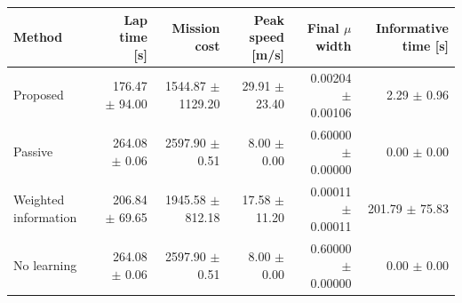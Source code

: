 \begin{tabular}{lrrrrr}
\toprule
Method & Lap time [s] & Mission cost & Peak speed [m/s] & Final $\mu$ width & Informative time [s] \\
\midrule
Proposed & 176.47 $\pm$ 94.00 & 1544.87 $\pm$ 1129.20 & 29.91 $\pm$ 23.40 & 0.00204 $\pm$ 0.00106 & 2.29 $\pm$ 0.96 \\
Passive & 264.08 $\pm$ 0.06 & 2597.90 $\pm$ 0.51 & 8.00 $\pm$ 0.00 & 0.60000 $\pm$ 0.00000 & 0.00 $\pm$ 0.00 \\
Weighted information & 206.84 $\pm$ 69.65 & 1945.58 $\pm$ 812.18 & 17.58 $\pm$ 11.20 & 0.00011 $\pm$ 0.00011 & 201.79 $\pm$ 75.83 \\
No learning & 264.08 $\pm$ 0.06 & 2597.90 $\pm$ 0.51 & 8.00 $\pm$ 0.00 & 0.60000 $\pm$ 0.00000 & 0.00 $\pm$ 0.00 \\
\bottomrule
\end{tabular}
